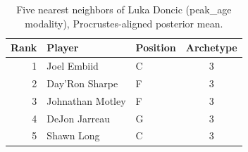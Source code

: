 \begin{table}[htbp]
  \centering\small
  \begin{tabular}{rllc}
    \toprule
    Rank & Player & Position & Archetype \\
    \midrule
    1 & Joel Embiid & C & 3 \\
    2 & Day'Ron Sharpe & F & 3 \\
    3 & Johnathan Motley & F & 3 \\
    4 & DeJon Jarreau & G & 3 \\
    5 & Shawn Long & C & 3 \\
    \bottomrule
  \end{tabular}
  \caption{Five nearest neighbors of Luka Doncic (peak_age modality), Procrustes-aligned posterior mean.}
  \label{tab:Luka_Doncic_neighbors_peak_age}
\end{table}

